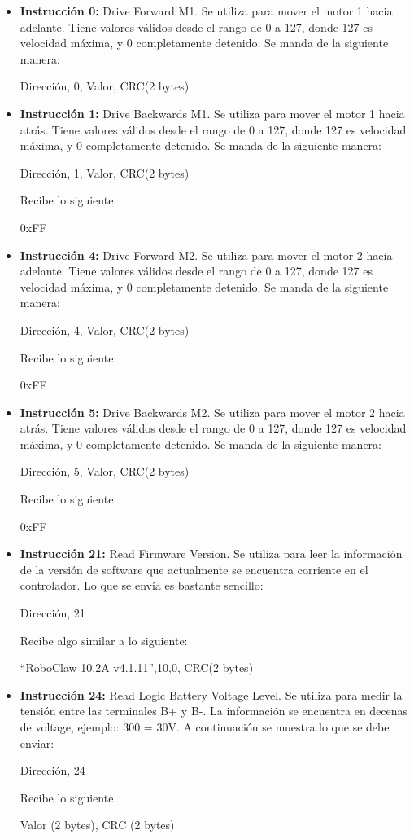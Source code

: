 \begin{itemize}
\item \textbf{Instrucción 0:} Drive Forward M1. Se utiliza para mover el motor 1 hacia adelante. Tiene valores válidos desde el rango de 0 a 127, donde 127 es velocidad máxima, y 0 completamente detenido. Se manda de la siguiente manera:

Dirección, 0,  Valor, CRC(2 bytes)

\item \textbf{Instrucción 1:} Drive Backwards M1. Se utiliza para mover el motor 1 hacia atrás. Tiene valores válidos desde el rango de 0 a 127, donde 127 es velocidad máxima, y 0 completamente detenido. Se manda de la siguiente manera:

Dirección, 1, Valor, CRC(2 bytes)

Recibe lo siguiente:

0xFF

\item \textbf{Instrucción 4:} Drive Forward M2. Se utiliza para mover el motor 2 hacia adelante. Tiene valores válidos desde el rango de 0 a 127, donde 127 es velocidad máxima, y 0 completamente detenido. Se manda de la siguiente manera:

Dirección, 4,  Valor, CRC(2 bytes)

Recibe lo siguiente:

0xFF

\item \textbf{Instrucción 5:} Drive Backwards M2. Se utiliza para mover el motor 2 hacia atrás. Tiene valores válidos desde el rango de 0 a 127, donde 127 es velocidad máxima, y 0 completamente detenido. Se manda de la siguiente manera:

Dirección, 5, Valor, CRC(2 bytes)

Recibe lo siguiente:

0xFF

\item \textbf{Instrucción 21:} Read Firmware Version. Se utiliza para leer la información de la versión de software que actualmente se encuentra corriente en el controlador. Lo que se envía es bastante sencillo:

Dirección, 21

Recibe algo similar a lo siguiente:

“RoboClaw 10.2A v4.1.11”,10,0, CRC(2 bytes)

\item \textbf{Instrucción 24:} Read Logic Battery Voltage Level. Se utiliza para medir la tensión entre las terminales B+ y B-. La información se encuentra en decenas de voltage, ejemplo: 300 = 30V. A continuación se muestra lo que se debe enviar:

Dirección, 24

Recibe lo siguiente

Valor (2 bytes), CRC (2 bytes)

\end{itemize}

